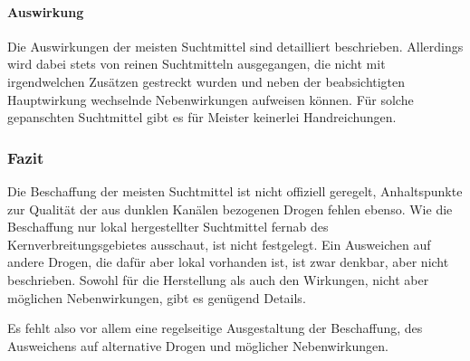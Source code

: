 \paragraph{Auswirkung}
Die Auswirkungen der meisten Suchtmittel sind detailliert beschrieben. Allerdings wird dabei stets von reinen Suchtmitteln ausgegangen, die nicht mit irgendwelchen Zusätzen gestreckt wurden und neben der beabsichtigten Hauptwirkung wechselnde Nebenwirkungen aufweisen können. Für solche gepanschten Suchtmittel gibt es für Meister keinerlei Handreichungen.

\subsubsection{Fazit}
Die Beschaffung der meisten Suchtmittel ist nicht offiziell geregelt, Anhaltspunkte zur Qualität der aus dunklen Kanälen bezogenen Drogen fehlen ebenso. Wie die Beschaffung nur lokal hergestellter Suchtmittel fernab des Kernverbreitungsgebietes ausschaut, ist nicht festgelegt. Ein Ausweichen auf andere Drogen, die dafür aber lokal vorhanden ist, ist zwar denkbar, aber nicht beschrieben. Sowohl für die Herstellung als auch den Wirkungen, nicht aber möglichen Nebenwirkungen, gibt es genügend Details.

Es fehlt also vor allem eine regelseitige Ausgestaltung der Beschaffung, des Ausweichens auf alternative Drogen und möglicher Nebenwirkungen.


